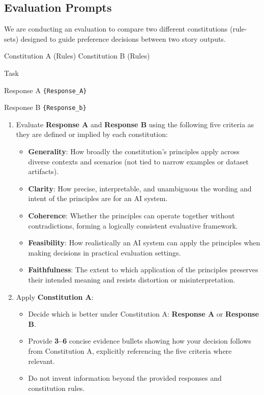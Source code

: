 \subsection{Evaluation Prompts}
\begin{tcolorbox}[
  enhanced jigsaw,
  breakable,
  colback=blue!5!white,
  colframe=blue!75!black,
  rounded corners,
  pad at break=0mm,
  title=Comparative Analysis of Constitutions,
  segmentation style={solid, line width=0pt},
  before skip=0pt,
  after skip=0pt,
]
We are conducting an evaluation to compare two different constitutions (rule-sets) designed to guide preference decisions between two story outputs.

{Constitution A (Rules)}
{Constitution B (Rules)}

{Task}

Response A
\verb|{Response_A}|

Response B
\verb|{Response_b}|

\begin{enumerate}
  \item Evaluate \textbf{Response A} and \textbf{Response B} using the following five criteria as they are defined or implied by each constitution:

  \begin{itemize}
    \item \textbf{Generality}: How broadly the constitution's principles apply across diverse contexts and scenarios (not tied to narrow examples or dataset artifacts).
    \item \textbf{Clarity}: How precise, interpretable, and unambiguous the wording and intent of the principles are for an AI system.
    \item \textbf{Coherence}: Whether the principles can operate together without contradictions, forming a logically consistent evaluative framework.
    \item \textbf{Feasibility}: How realistically an AI system can apply the principles when making decisions in practical evaluation settings.
    \item \textbf{Faithfulness}: The extent to which application of the principles preserves their intended meaning and resists distortion or misinterpretation.
  \end{itemize}

  \item Apply \textbf{Constitution A}:
  \begin{itemize}
    \item Decide which is better under Constitution A: \textbf{Response A} or \textbf{Response B}.
    \item Provide \textbf{3--6} concise evidence bullets showing how your decision follows from Constitution A, explicitly referencing the five criteria where relevant.
    \item Do not invent information beyond the provided responses and constitution rules.
  \end{itemize}


\end{enumerate}
\end{tcolorbox}
